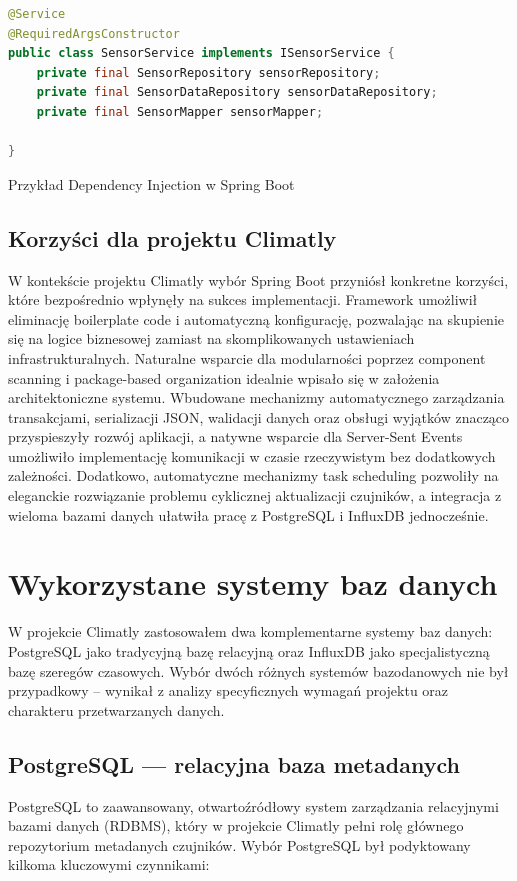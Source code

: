 \documentclass[a4paper,12pt,openany]{book}
\begin{document}
\begin{lstfloat}[htbp]
\begin{lstlisting}[language=java]
@Service
@RequiredArgsConstructor
public class SensorService implements ISensorService {
    private final SensorRepository sensorRepository;
    private final SensorDataRepository sensorDataRepository;
    private final SensorMapper sensorMapper;

}
\end{lstlisting}
\caption{Przykład Dependency Injection w Spring Boot}
\label{lst:dependency-injection}
\end{lstfloat}

\subsection*{Korzyści dla projektu Climatly}

W kontekście projektu Climatly wybór Spring Boot przyniósł konkretne korzyści, które bezpośrednio wpłynęły na sukces implementacji. Framework umożliwił eliminację boilerplate code i automatyczną konfigurację, pozwalając na skupienie się na logice biznesowej zamiast na skomplikowanych ustawieniach infrastrukturalnych. Naturalne wsparcie dla modularności poprzez component scanning i package-based organization idealnie wpisało się w założenia architektoniczne systemu. Wbudowane mechanizmy automatycznego zarządzania transakcjami, serializacji JSON, walidacji danych oraz obsługi wyjątków znacząco przyspieszyły rozwój aplikacji, a natywne wsparcie dla Server-Sent Events umożliwiło implementację komunikacji w czasie rzeczywistym bez dodatkowych zależności. Dodatkowo, automatyczne mechanizmy task scheduling pozwoliły na eleganckie rozwiązanie problemu cyklicznej aktualizacji czujników, a integracja z wieloma bazami danych ułatwiła pracę z PostgreSQL i InfluxDB jednocześnie.

\section{Wykorzystane systemy baz danych}
W projekcie Climatly zastosowałem dwa komplementarne systemy baz danych: PostgreSQL jako tradycyjną bazę relacyjną oraz InfluxDB jako specjalistyczną bazę szeregów czasowych. Wybór dwóch różnych systemów bazodanowych nie był przypadkowy – wynikał z analizy specyficznych wymagań projektu oraz charakteru przetwarzanych danych.
\subsection*{PostgreSQL --- relacyjna baza metadanych}
PostgreSQL to zaawansowany, otwartoźródłowy system zarządzania relacyjnymi bazami danych (RDBMS), który w projekcie Climatly pełni rolę głównego repozytorium metadanych czujników. Wybór PostgreSQL był podyktowany kilkoma kluczowymi czynnikami:
\end{document}
